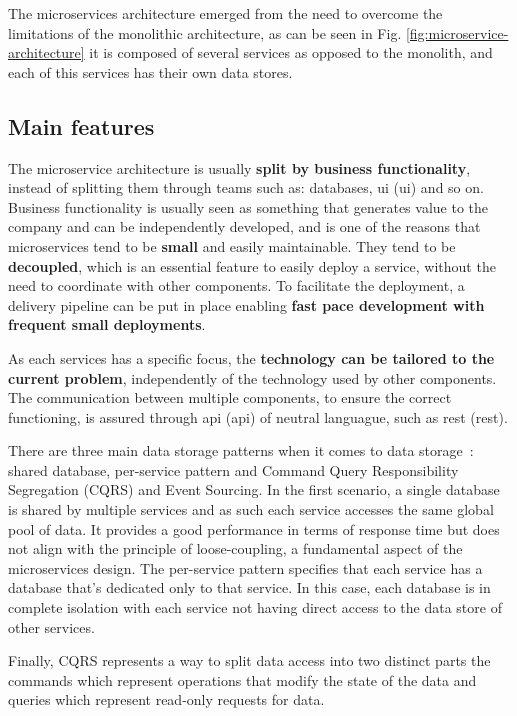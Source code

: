 The microservices architecture emerged from the need to overcome the limitations of the monolithic architecture, as can be seen in Fig. \ref{fig:microservice-architecture} it is composed of several services as opposed to the monolith, and each of this services has their own data stores.

\subsection{Main features}
\label{ss:microservices-features}

The microservice architecture is usually \textbf{split by business functionality}, instead of splitting them through teams such as: databases, \acrlong{ui} (\acrshort{ui}) and so on. Business functionality is usually seen as something that generates value to the company and can be independently developed, and is one of the reasons that microservices tend to be \textbf{small} and easily maintainable. They tend to be \textbf{decoupled}, which is an essential feature to easily deploy a service, without the need to coordinate with other components. To facilitate the deployment, a delivery pipeline can be put in place enabling \textbf{fast pace development with frequent small deployments}. 

As each services has a specific focus, the \textbf{technology can be tailored to the current problem}, independently of the technology used by other components. The communication between multiple components, to ensure the correct functioning, is assured through \acrlong{api} (\acrshort{api}) of neutral languague, such as \acrlong{rest} (\acrshort{rest}).

There are three main data storage patterns when it comes to data storage~\cite{9130516}: shared database, per-service pattern and Command Query Responsibility Segregation (CQRS) and Event Sourcing. In the first scenario, a single database is shared by multiple services and as such each service accesses the same global pool of data. It provides a good performance in terms of response time but does not align with the principle of loose-coupling, a fundamental aspect of the microservices design. The per-service pattern specifies that each service has a database that's dedicated only to that service. In this case, each database is in complete isolation with each service not having direct access to the data store of other services.

Finally, CQRS represents a way to split data access into two distinct parts the commands which represent operations that modify the state of the data and queries which represent read-only requests for data.

